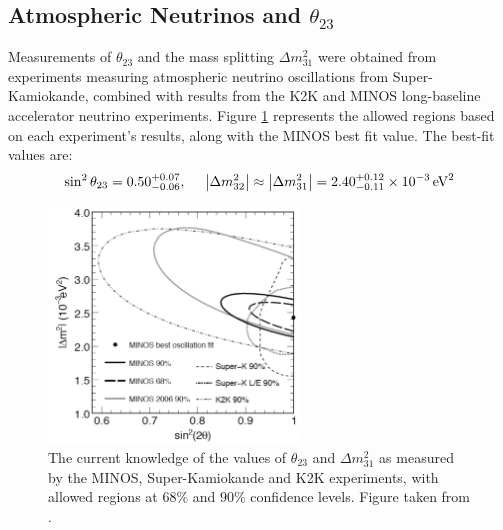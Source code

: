 \subsection{Atmospheric Neutrinos and $\theta_{23}$}
Measurements of $\theta_{23}$ and the mass splitting $\Delta m^2_{31}$ were obtained from experiments measuring atmospheric neutrino oscillations from Super-Kamiokande\citep{SuperK2006}, combined with results from the K2K\citep{K2K2006} and MINOS\citep{MINOS2008} long-baseline accelerator neutrino experiments. Figure \ref{fig:theta_23_confidence} represents the allowed regions based on each experiment's results, along with the MINOS best fit value. The best-fit values are\citep{Mezzetto2010}:
\begin{equation}\label{eqn:atmospheric_parameters}
\sin^2 \theta_{23} = 0.50^{+0.07}_{-0.06}, ~~~~\left|\Delta m^2_{32} \right| \approx \left| \Delta m^2_{31} \right| = 2.40^{+0.12}_{-0.11} \times 10^{-3} \,\mathrm{eV}^2
\end{equation}

\begin{figure}
\centering
\includegraphics[width=0.6\textwidth]{chapters/neutrinophysics_images/theta_23}
\caption[Allowed region for $\theta_{23}$ and $\Delta m^2_{31}$]{\label{fig:theta_23_confidence}The current knowledge of the values of $\theta_{23}$ and $\Delta m^2_{31}$ as measured by the MINOS, Super-Kamiokande and K2K experiments, with allowed regions at $68\%$ and $90\%$ confidence levels. Figure taken from \citep{PDG2011}.}
\end{figure}

